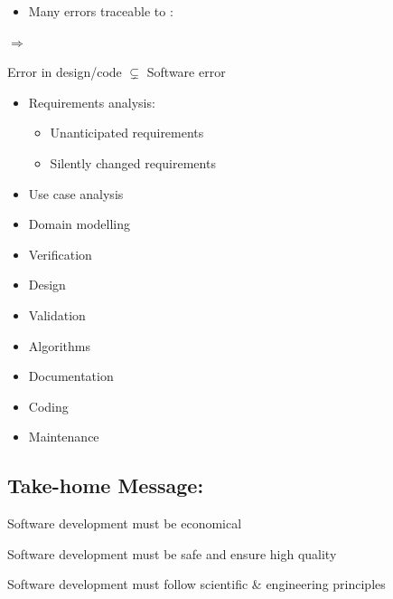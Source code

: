 \begin{defBox}[title=Detection an Error Presumes an Expectation (Requirement)]
\begin{itemize}
\begin{infoBox}
            \begin{itemize}
                \item {} Das Akronym steht für \enquote{It´s Not a Bug, It´s a Feature} und beschreibt die Haltung, dass eine unerwartete Verhaltensweise als gewollte Funktion angesehen werden kann, wenn die Anforderungen nicht klar definiert sind. Dies kaann zu Verwirrung und Frustration bei Benutzern führen 
            \end{itemize}
        \end{infoBox}
        \item Many errors traceable to : 
    \end{itemize}
    $\Rightarrow$ 
\end{defBox}
\begin{defBox}
    Error in design/code $\subsetneq$ Software  error 
\end{defBox}
\begin{defBox}[title=\enquote{Software} Errors present in every Construction Phase]
    \begin{itemize}
        \item Requirements analysis:
        \begin{itemize}
            \item Unanticipated requirements
            \item Silently changed requirements
        \end{itemize}
        \item Use case analysis
        \item Domain modelling      \item Verification 
        \item Design                \item Validation 
        \item Algorithms            \item Documentation
        \item Coding                \item Maintenance
    \end{itemize}
\end{defBox}
\subsection{Take-home Message:}
\begin{defBox}
    Software development must be economical
\end{defBox}
\begin{defBox}
    Software development must be safe and ensure high quality
\end{defBox}
\begin{defBox}
    Software development must follow scientific \& engineering principles
\end{defBox}
